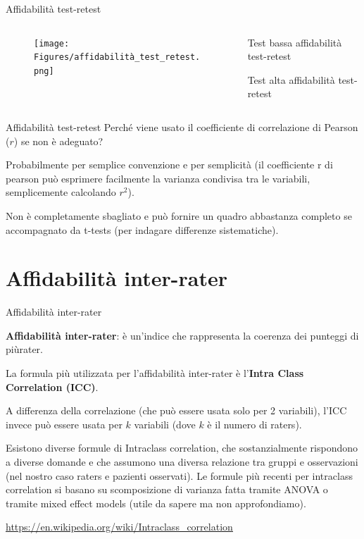 \documentclass[
  ignorenonframetext,
]{beamer}
\begin{document}
\begin{frame}{Affidabilità test-retest}
\label{affidabilituxe0-test-retest-6}
\begin{columns}
  \begin{column}{0.5\textwidth}
    \begin{figure}
    \texttt{[image: Figures/affidabilità\_test\_retest.png]}
    \end{figure}
  \end{column}
  \begin{column}{0.5\textwidth}
    Test bassa affidabilità test-retest
    
    \vspace{6em}
    Test alta affidabilità test-retest
  \end{column}
\end{columns}
\end{frame}

\begin{frame}{Affidabilità test-retest}
\label{affidabilituxe0-test-retest-7}
Perché viene usato il coefficiente di correlazione di Pearson (\(r\)) se
non è adeguato? \vspace{2em}

Probabilmente per semplice convenzione e per semplicità (il coefficiente
r di pearson può esprimere facilmente la varianza condivisa tra le
variabili, semplicemente calcolando \(r^2\)).

Non è completamente sbagliato e può fornire un quadro abbastanza
completo se accompagnato da t-tests (per indagare differenze
sistematiche).
\end{frame}

\section{Affidabilità inter-rater}\label{affidabilituxe0-inter-rater}

\begin{frame}{Affidabilità inter-rater}
\label{affidabilituxe0-inter-rater-1}
\small

\textbf{Affidabilità inter-rater}: è un'indice che rappresenta la
coerenza dei punteggi di piùrater.

La formula più utilizzata per l'affidabilità inter-rater è
l'\textbf{Intra Class Correlation (ICC)}.

A differenza della correlazione (che può essere usata solo per 2
variabili), l'ICC invece può essere usata per \(k\) variabili (dove
\(k\) è il numero di raters).

Esistono diverse formule di Intraclass correlation, che sostanzialmente
rispondono a diverse domande e che assumono una diversa relazione tra
gruppi e osservazioni (nel nostro caso raters e pazienti osservati). Le
formule più recenti per intraclass correlation si basano su
scomposizione di varianza fatta tramite ANOVA o tramite mixed effect
models (utile da sapere ma non approfondiamo).

\href{https://en.wikipedia.org/wiki/Intraclass_correlation}{\ul{https://en.wikipedia.org/wiki/Intraclass\_correlation}}
\end{frame}
\end{document}
